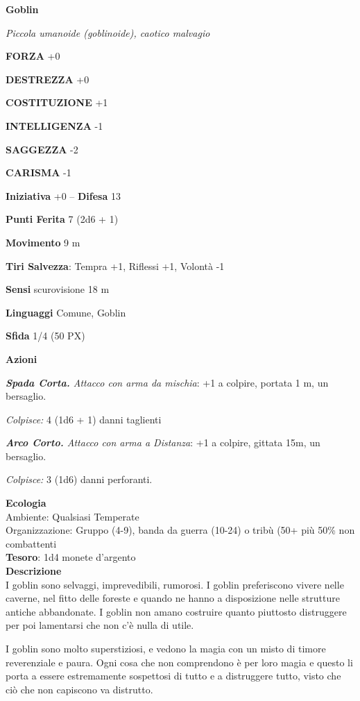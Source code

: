 \begin{multicols}{2}
\medskip{}\textbf{Goblin}

\textit{Piccola umanoide (goblinoide), caotico malvagio}

\textbf{FORZA} +0

\textbf{DESTREZZA} +0

\textbf{COSTITUZIONE} +1

\textbf{INTELLIGENZA} -1

\textbf{SAGGEZZA} -2

\textbf{CARISMA} -1

\textbf{Iniziativa} +0 -- \textbf{Difesa} 13

\textbf{Punti Ferita} 7 (2d6 + 1)

\textbf{Movimento} 9 m

\textbf{Tiri Salvezza}: Tempra +1, Riflessi +1, Volontà -1

\textbf{Sensi} scurovisione 18 m

\textbf{Linguaggi} Comune, Goblin

\textbf{Sfida} 1/4 (50 PX)

\textbf{Azioni}

\textit{\textbf{Spada Corta.} Attacco con arma da mischia}: +1 a colpire, portata 1 m, un bersaglio.

\textit{Colpisce:} 4 (1d6 + 1) danni taglienti

\textit{\textbf{Arco Corto.} Attacco con arma a Distanza}: +1 a colpire, gittata 15m, un bersaglio.

\textit{Colpisce:} 3 (1d6) danni perforanti.

\textbf{Ecologia}\\
Ambiente: Qualsiasi Temperate\\
Organizzazione: Gruppo (4-9), banda da guerra (10-24) o tribù (50+ più 50\% non combattenti\\
\textbf{Tesoro}: 1d4 monete d'argento\\
\textbf{Descrizione}\\
I goblin sono selvaggi, imprevedibili, rumorosi.
I goblin preferiscono vivere nelle caverne, nel fitto delle foreste e quando ne hanno a disposizione nelle strutture antiche abbandonate. I goblin non amano costruire quanto piuttosto distruggere per poi lamentarsi che non c'è nulla di utile.

I goblin sono molto superstiziosi, e vedono la magia con un misto di timore reverenziale e  paura. Ogni cosa che non comprendono è per loro magia e questo li porta a essere estremamente sospettosi di tutto e a distruggere tutto, visto che ciò che non capiscono va distrutto.


\end{multicols}
